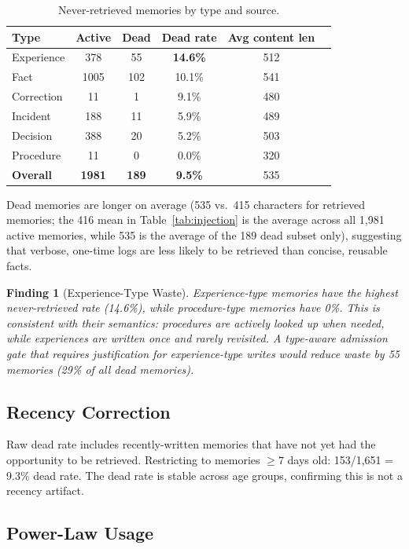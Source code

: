 \documentclass[10pt,twocolumn]{article}
\newtheorem{finding}{Finding}
\begin{document}
\begin{table}[h]
\centering
\caption{Never-retrieved memories by type and source.}
\label{tab:dead}
\begin{tabular}{lccccc}
\toprule
Type & Active & Dead & Dead rate & Avg content len \\
\midrule
Experience & 378 & 55 & \textbf{14.6\%} & 512 \\
Fact & 1005 & 102 & 10.1\% & 541 \\
Correction & 11 & 1 & 9.1\% & 480 \\
Incident & 188 & 11 & 5.9\% & 489 \\
Decision & 388 & 20 & 5.2\% & 503 \\
Procedure & 11 & 0 & 0.0\% & 320 \\
\midrule
\textbf{Overall} & \textbf{1981} & \textbf{189} & \textbf{9.5\%} & 535 \\
\bottomrule
\end{tabular}
\end{table}

Dead memories are longer on average (535 vs.\ 415 characters for retrieved memories; the 416 mean in Table~\ref{tab:injection} is the average across all 1,981 active memories, while 535 is the average of the 189 dead subset only), suggesting that verbose, one-time logs are less likely to be retrieved than concise, reusable facts.

\begin{finding}[Experience-Type Waste]
Experience-type memories have the highest never-retrieved rate (14.6\%), while procedure-type memories have 0\%. This is consistent with their semantics: procedures are actively looked up when needed, while experiences are written once and rarely revisited. A type-aware admission gate that requires justification for experience-type writes would reduce waste by 55 memories (29\% of all dead memories).
\end{finding}

\subsection{Recency Correction}

Raw dead rate includes recently-written memories that have not yet had the opportunity to be retrieved. Restricting to memories $\geq 7$ days old: 153/1,651 = 9.3\% dead rate. The dead rate is stable across age groups, confirming this is not a recency artifact.

\subsection{Power-Law Usage}
\label{sec:powerlaw}
\end{document}
